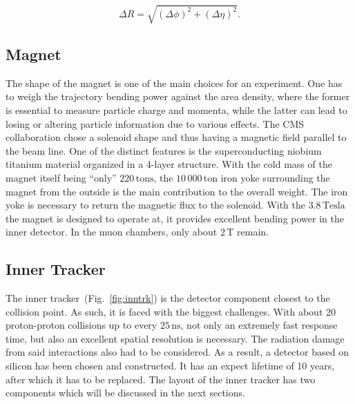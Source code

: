 \begin{equation}
  \label{eq:spatdiff}
  \Delta R = \sqrt{\left(\Delta \phi\right)^2 + \left(\Delta \eta\right)^2}.
\end{equation}

\subsection{Magnet}

The shape of the magnet is one of the main choices for an experiment. One has to weigh the trajectory bending power against the area density, where the former is essential to measure particle charge and momenta, while the latter can lead to losing or altering particle information due to various effects. The CMS collaboration chose a solenoid shape and thus having a magnetic field parallel to the beam line. One of the distinct features is the superconducting niobium titanium material organized in a 4-layer structure. With the cold mass of the magnet itself being ``only'' $220\,\text{tons}$, the $10\,000\,\text{ton}$ iron yoke surrounding the magnet from the outside is the main contribution to the overall weight. The iron yoke is necessary to return the magnetic flux to the solenoid. With the $3.8\,\text{Tesla}$ the magnet is designed to operate at, it provides excellent bending power in the inner detector. In the muon chambers, only about $2\,\text{T}$ remain.

\subsection{Inner Tracker}
\label{sec:innertracker}

The inner tracker~(Fig.~\ref{fig:inntrk}) is the detector component closest to the collision point. As such, it is faced with the biggest challenges. With about 20 proton-proton collisions up to every $25\,\text{ns}$, not only an extremely fast response time, but also an excellent spatial resolution is necessary. The radiation damage from said interactions also had to be considered. As a result, a detector based on silicon has been chosen and constructed. It has an expect lifetime of 10 years, after which it has to be replaced. The layout of the inner tracker has two components which will be discussed in the next sections.

